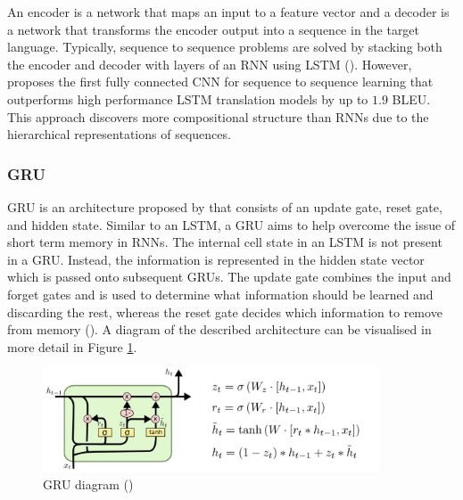 
An encoder is a network that maps an input to a feature vector and a decoder is a network that transforms the encoder output into a sequence in the target language. Typically, sequence to sequence problems are solved by stacking both the encoder and decoder with layers of an RNN using \acrshort{LSTM} (\cite{luong_effective_2015}). However, \cite{gehring_convolutional_2017} proposes the first fully connected \acrshort{CNN} for sequence to sequence learning that outperforms high performance \acrshort{LSTM} translation models by up to $1.9$ \acrshort{BLEU}. This approach discovers more compositional structure than \acrshort{RNN}s due to the hierarchical representations of sequences.

\subsubsection{\acrlong{GRU}}


\acrfull{GRU} is an architecture proposed by \cite{cho_properties_2014} that consists of an update gate, reset gate, and hidden state. Similar to an \acrshort{LSTM}, a \acrshort{GRU} aims to help overcome the issue of short term memory in \acrshort{RNN}s.
The internal cell state in an \acrshort{LSTM} is not present in a \acrshort{GRU}. Instead, the information is represented in the hidden state vector which is passed onto subsequent \acrshort{GRU}s.
The update gate combines the input and forget gates and is used to determine what information should be learned and discarding the rest, whereas the reset gate decides which information to remove from memory (\cite{gao_gru_2016}).
A diagram of the described architecture can be visualised in more detail in Figure \ref{fig:rnn_gru}.
\begin{figure}[ht!]
\centering
\includegraphics[width=0.89\textwidth]{media/literature/machine_learning/ml_rnn_gru.png}
\caption[Diagram of Gated Recurrent Unit]{\acrfull{GRU} diagram (\cite{colah_lstm_2019})}
\label{fig:rnn_gru}
\end{figure}

